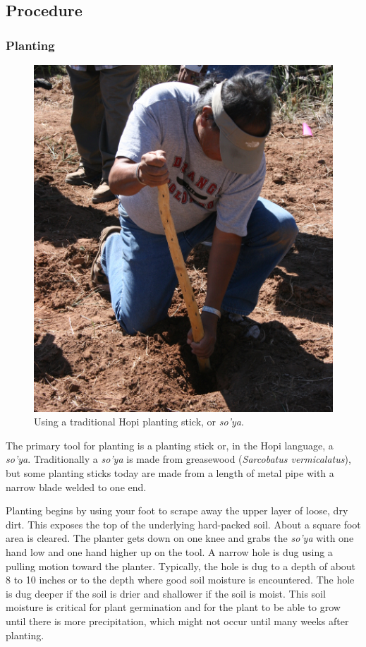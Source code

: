\documentclass[12pt,]{article}
\begin{document}
\hypertarget{procedure}{%
\subsection{Procedure}\label{procedure}}

\hypertarget{planting}{%
\subsubsection*{Planting}\label{planting}}

\begin{figure}
\centering
\includegraphics{./images/chapter_6_soya.jpg}
\caption{Using a traditional Hopi planting stick, or \emph{so'ya}.}
\end{figure}

The primary tool for planting is a planting stick or, in the Hopi language, a \emph{so'ya}. Traditionally a \emph{so'ya} is made from greasewood (\emph{Sarcobatus vermicalatus}), but some planting sticks today are made from a length of metal pipe with a narrow blade welded to one end.

Planting begins by using your foot to scrape away the upper layer of loose, dry dirt. This exposes the top of the underlying hard-packed soil. About a square foot area is cleared. The planter gets down on one knee and grabs the \emph{so'ya} with one hand low and one hand higher up on the tool. A narrow hole is dug using a pulling motion toward the planter. Typically, the hole is dug to a depth of about 8 to 10 inches or to the depth where good soil moisture is encountered. The hole is dug deeper if the soil is drier and shallower if the soil is moist. This soil moisture is critical for plant germination and for the plant to be able to grow until there is more precipitation, which might not occur until many weeks after planting.
\end{document}
